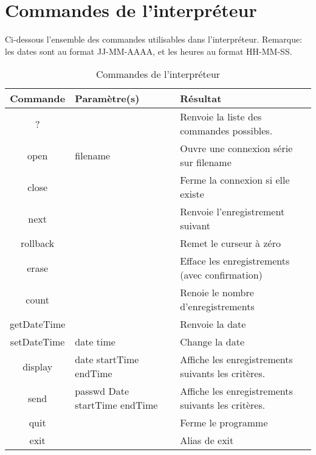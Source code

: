 \chapter{Commandes de l'interpréteur}

    Ci-dessous l'ensemble des commandes utilisables dans l'interpréteur. Remarque:
les dates sont au format JJ-MM-AAAA, et les heures au format HH-MM-SS.

\begin{table}[h]
\begin{center}

    \begin{tabular}{|c|M{2.5cm}|M{6cm}|}
    \hline
    Commande & Paramètre(s) & Résultat \tabularnewline
    \hline
    ? &  & Renvoie la liste des commandes possibles. \tabularnewline
    \hline
    open & filename & Ouvre une connexion série sur filename \tabularnewline
    \hline
    close &  & Ferme la connexion si elle existe \tabularnewline
    \hline
    next &  &  Renvoie l'enregistrement suivant \tabularnewline
    \hline
    rollback &  & Remet le curseur à zéro \tabularnewline
    \hline
    erase &  & Efface les enregistrements (avec confirmation) \tabularnewline
    \hline
    count &  & Renoie le nombre d'enregistrements \tabularnewline
    \hline
    getDateTime &  & Renvoie la date \tabularnewline
    \hline
    setDateTime & date time & Change la date \tabularnewline
    \hline
    display & date startTime endTime & Affiche les enregistrements suivants les critères. \tabularnewline
    \hline
    send & passwd Date startTime endTime & Affiche les enregistrements suivants les critères. \tabularnewline
    \hline
    quit &  & Ferme le programme \tabularnewline
    \hline
    exit &  & Alias de exit \tabularnewline
    \hline
    \end{tabular}

\end{center}
\caption{Commandes de l'interpréteur}
\label{Commandes de l'interpréteur}
\end{table}

